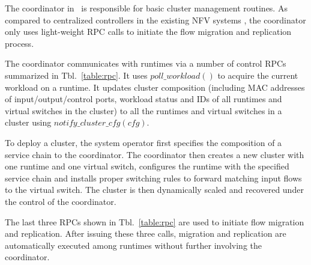 The coordinator in \nfactor~is responsible for basic cluster management routines. %
As compared to centralized controllers in the existing NFV systems \cite{gember2015opennf, rajagopalan2013split}, the coordinator only uses light-weight RPC calls to initiate the flow migration and replication process.

The coordinator communicates with runtimes via a number of control RPCs summarized in Tbl.~\ref{table:rpc}. It uses $poll\_workload()$ to acquire the current workload on a runtime. It updates cluster composition (including MAC addresses of input/output/control ports, workload status and IDs of all runtimes and virtual switches in the cluster) to all the runtimes and virtual switches in a cluster using $notify\_cluster\_cfg(cfg)$.

To deploy a cluster, the system operator first specifies the composition of a service chain to the coordinator. The coordinator then creates a new cluster with one runtime and one virtual switch, configures the runtime with the specified service chain and installs proper switching rules to forward matching input flows to the virtual switch. The cluster is then dynamically scaled and recovered under the control of the coordinator.

The last three RPCs shown in Tbl.~\ref{table:rpc} are used to initiate flow migration and replication. After issuing these three calls, migration and replication are automatically executed among runtimes without further involving the coordinator.



